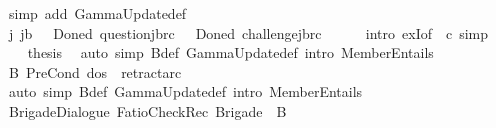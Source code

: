 \begin{isabellebody}
\ {\isacharparenleft}{\kern0pt}simp\ add{\isacharcolon}{\kern0pt}\ GammaUpdate{\isacharunderscore}{\kern0pt}def{\isacharparenright}{\kern0pt}\isanewline
\ \ \isamarkupfalse%
\ {\isachardoublequoteopen}{\isasymexists}j{\isachardot}{\kern0pt}\ j{\isasymnoteq}b\ {\isasymand}\ {\isacharparenleft}{\kern0pt}{\isasymGamma}\ {\isacharparenleft}{\kern0pt}Done\isactrlsup d\ question{\isacharbrackleft}{\kern0pt}j{\isacharcomma}{\kern0pt}b{\isacharcomma}{\kern0pt}r\isactrlsup c{\isacharbrackright}{\kern0pt}{\isacharparenright}{\kern0pt}\ {\isasymor}\ {\isasymGamma}\ {\isacharparenleft}{\kern0pt}Done\isactrlsup d\ challenge{\isacharbrackleft}{\kern0pt}j{\isacharcomma}{\kern0pt}b{\isacharcomma}{\kern0pt}r\isactrlsup c{\isacharbrackright}{\kern0pt}{\isacharparenright}{\kern0pt}{\isacharparenright}{\kern0pt}{\isachardoublequoteclose}\isanewline
\ \ \ \ \isamarkupfalse%
\ {\isacharparenleft}{\kern0pt}intro\ exI{\isacharbrackleft}{\kern0pt}of\ {\isacharunderscore}{\kern0pt}\ c{\isacharbrackright}{\kern0pt}{\isacharparenright}{\kern0pt}\ simp\isanewline
\ \ \isamarkupfalse%
\ {\isacharquery}{\kern0pt}thesis\ \isamarkupfalse%
\ {\isacharparenleft}{\kern0pt}auto\ simp{\isacharcolon}{\kern0pt}\ {\isasymGamma}\isactrlsub B{\isacharunderscore}{\kern0pt}def\ GammaUpdate{\isacharunderscore}{\kern0pt}def\ intro{\isacharbang}{\kern0pt}{\isacharcolon}{\kern0pt}\ MemberEntails{\isacharparenright}{\kern0pt}\isanewline
{}\isamarkupfalse%
%
\endisatagproof
{\isafoldproof}%
%
\isadelimproof
\isanewline
%
\endisadelimproof
{}\isamarkupfalse%
\ B{}{\isacharcolon}{\kern0pt}\ {\isachardoublequoteopen}PreCond\ dos\ {\isasymGamma}\ retract{\isacharbrackleft}{\kern0pt}a{\isacharcomma}{\kern0pt}r\isactrlsup c{\isacharcomma}{\kern0pt}{\isasymoplus}{\isacharbrackright}{\kern0pt}{\isachardoublequoteclose}\isanewline
%
\isadelimproof
\ \ %
\endisadelimproof
%
\isatagproof
{}\isamarkupfalse%
\ {\isacharparenleft}{\kern0pt}auto\ simp{\isacharcolon}{\kern0pt}\ {\isasymGamma}\isactrlsub B{\isacharunderscore}{\kern0pt}def\ GammaUpdate{\isacharunderscore}{\kern0pt}def\ intro{\isacharbang}{\kern0pt}{\isacharcolon}{\kern0pt}\ MemberEntails{\isacharparenright}{\kern0pt}%
\endisatagproof
{\isafoldproof}%
%
\isadelimproof
\isanewline
%
\endisadelimproof
\isanewline
{}\isamarkupfalse%
\ BrigadeDialogue{\isacharcolon}{\kern0pt}\ {\isachardoublequoteopen}FatioCheckRec\ Brigade\ {\isacharbrackleft}{\kern0pt}{\isacharbrackright}{\kern0pt}\ {\isasymGamma}\isactrlsub B{\isachardoublequoteclose}\isanewline

\end{isabellebody}
